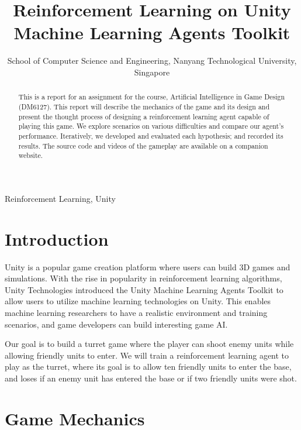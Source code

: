 \documentclass[conference]{IEEEtran}
\begin{document}
\title{Reinforcement Learning on Unity Machine Learning Agents Toolkit}

\author{
School of Computer Science and Engineering, Nanyang Technological University, Singapore
}

\maketitle

\begin{abstract}
This is a report for an assignment for the course, Artificial Intelligence in Game Design (DM6127). This report will describe the mechanics of the game and its design and present the thought process of designing a reinforcement learning agent capable of playing this game. We explore scenarios on various difficulties and compare our agent's performance. Iteratively, we developed and evaluated each hypothesis; and recorded its results. The source code and videos of the gameplay are available on a companion website.
\end{abstract}

\begin{IEEEkeywords}
Reinforcement Learning, Unity
\end{IEEEkeywords}

\section{Introduction}

Unity is a popular game creation platform where users can build 3D games and simulations. With the rise in popularity in reinforcement learning algorithms, Unity Technologies introduced the Unity Machine Learning Agents Toolkit to allow users to utilize machine learning technologies on Unity. This enables machine learning researchers to have a realistic environment and training scenarios, and game developers can build interesting game AI.

Our goal is to build a turret game where the player can shoot enemy units while allowing friendly units to enter. We will train a reinforcement learning agent to play as the turret, where its goal is to allow ten friendly units to enter the base, and loses if an enemy unit has entered the base or if two friendly units were shot.

\section{Game Mechanics}
\end{document}
